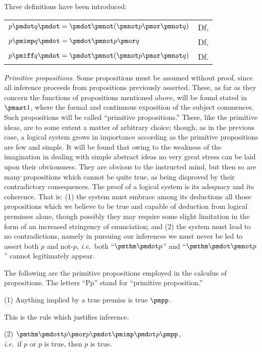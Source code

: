\documentclass[letterpaper,12pt,openany,leqno]{book}
\newcommand{\pagefirst}[1]{\marginnote[\boxed{\text{#1}}]{\boxed{\text{#1}}}}
\begin{document}
Three definitions have been introduced:
\begin{center}
\begin{tabular}{c | c}
	\multicolumn{1}{l}{$p \pmdot q \pmdot = \pmdot \pmnot(\pmnot p \pmor \pmnot q)$} & Df, \\
	\multicolumn{1}{l}{$p \pmimp q \pmdot = \pmdot \pmnot p \pmor q$} & Df, \\
	\multicolumn{1}{l}{$p \pmiff q \pmdot = \pmdot \pmnot(\pmnot p \pmor \pmnot q)$} & Df.
\end{tabular}
\end{center}
\pagefirst{13} \textit{Primitive propositions.} Some propositions must be assumed without proof, since all inference proceeds from propositions previously asserted. These, as far as they concern the functions of propositions mentioned above, will be found stated in $\pmast1$, where the formal and continuous exposition of the subject commences. Such propositions will be called ``primitive propositions.'' These, like the primitive ideas, are to some extent a matter of arbitrary choice; though, as in the previous case, a logical system grows in importance according as the primitive propositions are few and simple. It will be found that owing to the weakness of the imagination in dealing with simple abstract ideas no very great stress can be laid upon their obviousness. They are obvious to the instructed mind, but then so are many propositions which cannot be quite true, as being disproved by their contradictory consequences. The proof of a logical system is its adequacy and its coherence. That is: (1) the system must embrace among its deductions all those propositions which we believe to be true and capable of deduction from logical premisses alone, though possibly they may require some slight limitation in the form of an increased stringency of enunciation; and (2) the system must lead to no contradictions, namely in pursuing our inferences we must never be led to assert both $p$ and not-$p$, \textit{i.e.}\ both ``$\pmthm \pmdot p$'' and ``$\pmthm \pmdot \pmnot p$'' cannot legitimately appear.

The following are the primitive propositions employed in the calculus of propositions. The letters ``Pp'' stand for ``primitive proposition.'' 

(1) \indent Anything implied by a true premiss is true $\pmpp$.

This is the rule which justifies inference.

(2) \indent $\pmthm\pmdott p\pmor p\pmdot\pmimp\pmdot p \pmpp$,\\
\textit{i.e.}\ if $p$ or $p$ is true, then $p$ is true.
\end{document}
